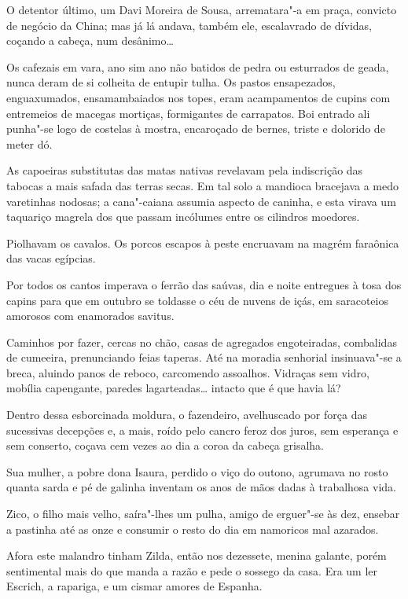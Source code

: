 O detentor último, um Davi Moreira de Sousa, arrematara"-a em praça,
convicto de negócio da China; mas já lá andava, também ele, escalavrado
de dívidas, coçando a cabeça, num desânimo\ldots{}

Os cafezais em vara, ano sim ano não batidos de pedra ou esturrados de
geada, nunca deram de si colheita de entupir tulha. Os pastos
ensapezados, enguaxumados, ensamambaiados nos topes, eram acampamentos
de cupins com entremeios de macegas mortiças, formigantes de carrapatos.
Boi entrado ali punha"-se logo de costelas à mostra, encaroçado de
bernes, triste e dolorido de meter dó.

As capoeiras substitutas das matas nativas revelavam pela indiscrição
das tabocas a mais safada das terras secas. Em tal solo a mandioca
bracejava a medo varetinhas nodosas; a cana"-caiana assumia aspecto de
caninha, e esta virava um taquariço magrela dos que passam incólumes
entre os cilindros moedores.

Piolhavam os cavalos. Os porcos escapos à peste encruavam na magrém
faraônica das vacas egípcias.

Por todos os cantos imperava o ferrão das saúvas, dia e noite entregues
à tosa dos capins para que em outubro se toldasse o céu de nuvens de
içás, em saracoteios amorosos com enamorados savitus.

Caminhos por fazer, cercas no chão, casas de agregados engoteiradas,
combalidas de cumeeira, prenunciando feias taperas. Até na moradia
senhorial insinuava"-se a breca, aluindo panos de reboco, carcomendo
assoalhos. Vidraças sem vidro, mobília capengante, paredes
lagarteadas\ldots{} intacto que é que havia lá?

Dentro dessa esborcinada moldura, o fazendeiro, avelhuscado por força
das sucessivas decepções e, a mais, roído pelo cancro feroz dos juros,
sem esperança e sem conserto, coçava cem vezes ao dia a coroa da cabeça
grisalha.

Sua mulher, a pobre dona Isaura, perdido o viço do outono, agrumava no
rosto quanta sarda e pé de galinha inventam os anos de mãos dadas à
trabalhosa vida.

Zico, o filho mais velho, saíra"-lhes um pulha, amigo de erguer"-se às
dez, ensebar a pastinha até as onze e consumir o resto do dia em
namoricos mal azarados.

Afora este malandro tinham Zilda, então nos dezessete, menina galante,
porém sentimental mais do que manda a razão e pede o sossego da casa.
Era um ler Escrich, a rapariga, e um cismar amores de Espanha.

